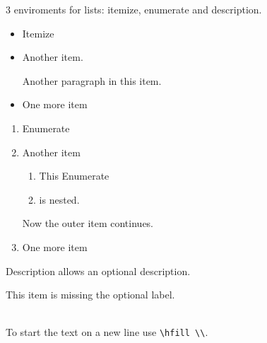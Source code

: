 \documentclass{article}
\begin{document}
3 enviroments for lists: itemize, enumerate and description.

\begin{itemize}
	\item Itemize
	\item Another item.

		Another paragraph in this item.
	\item
		One more item
\end{itemize}

\begin{enumerate}
	\item Enumerate
	\item Another item
		\begin{enumerate}
			\item This Enumerate
			\item is nested.
		\end{enumerate}
		Now the outer item continues.
	\item One more item
\end{enumerate}

\begin{description}
	\item[Custom Label] Description allows an optional description.
	\item This item is missing the optional label.
	\item[Another Label] \hfill \\
		To start the text on a new line use \verb+\hfill \\+.
\end{description}
\end{document}
